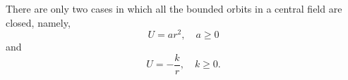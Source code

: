 There are only two cases in which all the bounded orbits in a central field are closed, namely,
$$U = ar^2, \quad a \geq 0$$
and
$$U = -\frac{k}{r}, \quad k \geq 0.$$
